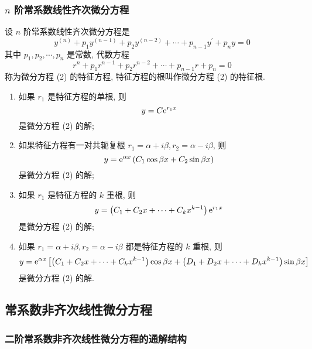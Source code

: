 \subsubsection{$n$ 阶常系数线性齐次微分方程}

\begin{theorem}[$n$ 阶常系数线性齐次微分方程通解结构]
    设 $ n $ 阶常系数线性齐次微分方程是
    \begin{equation*}
        y^{(n)}+p_{1} y^{(n-1)}+p_{2} y^{(n-2)}+\cdots+p_{n-1} y^{\prime}+p_{n} y=0
        \tag{2}
    \end{equation*}
    其中 $ p_{1}, p_{2}, \cdots, p_{n} $ 是常数, 代数方程
    $$r^{n}+p_{1} r^{n-1}+p_{2} r^{n-2}+\cdots+p_{n-1} r+p_{n}=0$$
    称为微分方程 (2) 的特征方程, 特征方程的根叫作微分方程 (2) 的特征根.
    \begin{enumerate}[label=(\arabic{*})]
        \item 如果 $ r_{1} $ 是特征方程的单根, 则
              $$y=C \mathrm{e}^{r_{1} x}$$
              是微分方程 (2) 的解;
        \item 如果特征方程有一对共轭复根 $ r_{1}=\alpha+i \beta, r_{2}=\alpha-i \beta$, 则
              $$y=\mathrm{e}^{\alpha x}\left(C_{1} \cos \beta x+C_{2} \sin \beta x\right)$$
              是微分方程 (2) 的解;
        \item 如果 $ r_{1} $ 是特征方程的 $ k $ 重根, 则
              $$y=\left(C_{1}+C_{2} x+\cdots+C_{k} x^{k-1}\right) \mathrm{e}^{r_{1} x}$$
              是微分方程 (2) 的解;
        \item 如果 $ r_{1}=\alpha+i \beta, r_{2}=\alpha-i \beta $ 都是特征方程的 $ k $ 重根, 则
              $$y=\mathrm{e}^{\alpha x}\left[\left(C_{1}+C_{2} x+\cdots+C_{k} x^{k-1}\right) \cos \beta x+\left(D_{1}+D_{2} x+\cdots+D_{k} x^{k-1}\right) \sin \beta x\right]$$
              是微分方程 (2) 的解.
    \end{enumerate}
\end{theorem}

\subsection{常系数非齐次线性微分方程}

\subsubsection{二阶常系数非齐次线性微分方程的通解结构}

